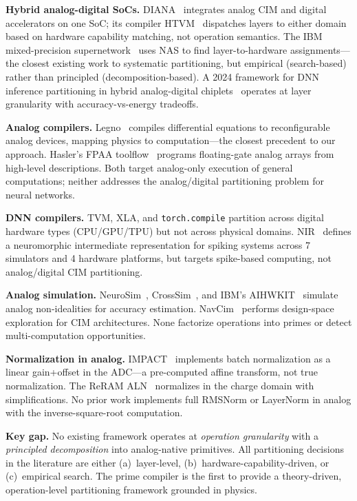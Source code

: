 \documentclass[11pt]{article}
\begin{document}
\textbf{Hybrid analog-digital SoCs.} DIANA~\cite{diana2022} integrates analog CIM and digital accelerators on one SoC; its compiler HTVM~\cite{htvm2023} dispatches layers to either domain based on hardware capability matching, not operation semantics. The IBM mixed-precision supernetwork~\cite{ibm_supernetwork2026} uses NAS to find layer-to-hardware assignments---the closest existing work to systematic partitioning, but empirical (search-based) rather than principled (decomposition-based). A 2024 framework for DNN inference partitioning in hybrid analog-digital chiplets~\cite{hybrid_partition2024} operates at layer granularity with accuracy-vs-energy tradeoffs.

\textbf{Analog compilers.} Legno~\cite{legno2020} compiles differential equations to reconfigurable analog devices, mapping physics to computation---the closest precedent to our approach. Hasler's FPAA toolflow~\cite{hasler2020} programs floating-gate analog arrays from high-level descriptions. Both target analog-only execution of general computations; neither addresses the analog/digital partitioning problem for neural networks.

\textbf{DNN compilers.} TVM, XLA, and \texttt{torch.compile} partition across digital hardware types (CPU/GPU/TPU) but not across physical domains. NIR~\cite{nir2024} defines a neuromorphic intermediate representation for spiking systems across 7 simulators and 4 hardware platforms, but targets spike-based computing, not analog/digital CIM partitioning.

\textbf{Analog simulation.} NeuroSim~\cite{neurosim}, CrossSim~\cite{crosssim}, and IBM's AIHWKIT~\cite{aihwkit2023} simulate analog non-idealities for accuracy estimation. NavCim~\cite{navcim2024} performs design-space exploration for CIM architectures. None factorize operations into primes or detect multi-computation opportunities.

\textbf{Normalization in analog.} IMPACT~\cite{impact2023} implements batch normalization as a linear gain+offset in the ADC---a pre-computed affine transform, not true normalization. The ReRAM ALN~\cite{reram_aln2022} normalizes in the charge domain with simplifications. No prior work implements full RMSNorm or LayerNorm in analog with the inverse-square-root computation.

\textbf{Key gap.} No existing framework operates at \textit{operation granularity} with a \textit{principled decomposition} into analog-native primitives. All partitioning decisions in the literature are either (a)~layer-level, (b)~hardware-capability-driven, or (c)~empirical search. The prime compiler is the first to provide a theory-driven, operation-level partitioning framework grounded in physics.
\end{document}
